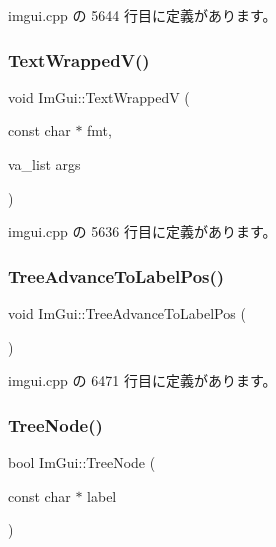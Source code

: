  imgui.\+cpp の 5644 行目に定義があります。

\mbox{\label{namespace_im_gui_a9019a388cd0c410bcb3d3ae63a008123}} 
\subsubsection{\texorpdfstring{Text\+Wrapped\+V()}{TextWrappedV()}}
{\footnotesize\ttfamily void Im\+Gui\+::\+Text\+WrappedV (\begin{DoxyParamCaption}\item[{const char $\ast$}]{fmt,  }\item[{va\+\_\+list}]{args }\end{DoxyParamCaption})}



 imgui.\+cpp の 5636 行目に定義があります。

\mbox{\label{namespace_im_gui_a54e15c2f65cea3aeddd66b5dcfb45716}} 
\subsubsection{\texorpdfstring{Tree\+Advance\+To\+Label\+Pos()}{TreeAdvanceToLabelPos()}}
{\footnotesize\ttfamily void Im\+Gui\+::\+Tree\+Advance\+To\+Label\+Pos (\begin{DoxyParamCaption}{ }\end{DoxyParamCaption})}



 imgui.\+cpp の 6471 行目に定義があります。

\mbox{\label{namespace_im_gui_a4dff507ce8bbe0da9556bb50b1e60d7f}} 
\subsubsection{\texorpdfstring{Tree\+Node()}{TreeNode()}\hspace{0.1cm}{\footnotesize\ttfamily [1/3]}}
{\footnotesize\ttfamily bool Im\+Gui\+::\+Tree\+Node (\begin{DoxyParamCaption}\item[{const char $\ast$}]{label }\end{DoxyParamCaption})}



